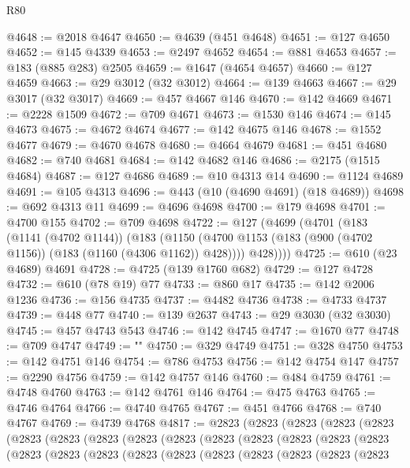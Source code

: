 \begin{lexlean}{R80}
\begin{coremodule}
@4648 := @2018 @4647
@4650 := @4639 (@451 @4648)
@4651 := @127 @4650
@4652 := @145 @4339
@4653 := @2497 @4652
@4654 := @881 @4653
@4657 := @183 (@885 @283) @2505
@4659 := @1647 (@4654 @4657)
@4660 := @127 @4659
@4663 := @29 @3012 (@32 @3012)
@4664 := @139 @4663
@4667 := @29 @3017 (@32 @3017)
@4669 := @457 @4667 @146
@4670 := @142 @4669
@4671 := @2228 @1509
@4672 := @709 @4671
@4673 := @1530 @146
@4674 := @145 @4673
@4675 := @4672 @4674
@4677 := @142 @4675 @146
@4678 := @1552 @4677
@4679 := @4670 @4678
@4680 := @4664 @4679
@4681 := @451 @4680
@4682 := @740 @4681
@4684 := @142 @4682 @146
@4686 := @2175 (@1515 @4684)
@4687 := @127 @4686
@4689 := @10 @4313 @14
@4690 := @1124 @4689
@4691 := @105 @4313
@4696 := @443 (@10 (@4690 @4691) (@18 @4689))
@4698 := @692 @4313 @11
@4699 := @4696 @4698
@4700 := @179 @4698
@4701 := @4700 @155
@4702 := @709 @4698
@4722 := @127
    (@4699
      (@4701
        (@183
          (@1141 (@4702 @1144))
          (@183
            (@1150 (@4700 @1153 (@183 (@900 (@4702 @1156)) (@183 (@1160 (@4306 @1162)) @428))))
            @428))))
@4725 := @610 (@23 @4689) @4691
@4728 := @4725 (@139 @1760 @682)
@4729 := @127 @4728
@4732 := @610 (@78 @19) @77
@4733 := @860 @17
@4735 := @142 @2006 @1236
@4736 := @156 @4735
@4737 := @4482 @4736
@4738 := @4733 @4737
@4739 := @448 @77
@4740 := @139 @2637
@4743 := @29 @3030 (@32 @3030)
@4745 := @457 @4743 @543
@4746 := @142 @4745
@4747 := @1670 @77
@4748 := @709 @4747
@4749 := "\n"
@4750 := @329 @4749
@4751 := @328 @4750
@4753 := @142 @4751 @146
@4754 := @786 @4753
@4756 := @142 @4754 @147
@4757 := @2290 @4756
@4759 := @142 @4757 @146
@4760 := @484 @4759
@4761 := @4748 @4760
@4763 := @142 @4761 @146
@4764 := @475 @4763
@4765 := @4746 @4764
@4766 := @4740 @4765
@4767 := @451 @4766
@4768 := @740 @4767
@4769 := @4739 @4768
@4817 := @2823
    (@2823
      (@2823
        (@2823
          (@2823
            (@2823
              (@2823
                (@2823
                  (@2823
                    (@2823
                      (@2823
                        (@2823
                          (@2823
                            (@2823
                              (@2823
                                (@2823
                                  (@2823
                                    (@2823
                                      (@2823
                                        (@2823
                                          (@2823
                                            (@2823
                                              (@2823
                                                (@2823
                                                  (@2823

\end{coremodule}
\end{lexlean}
